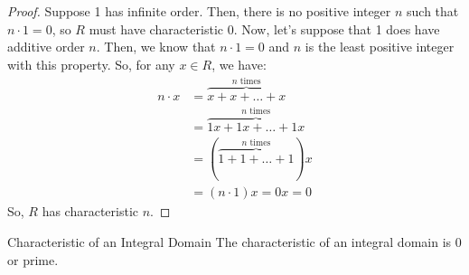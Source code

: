 \documentclass[letterpaper]{article}
\begin{document}
\begin{mdframed}[]
    \begin{proof}
        Suppose 1 has infinite order. Then, there is no positive integer $n$ such that $n \cdot 1 = 0$, so $R$ must have characteristic 0. Now, let's suppose that 1 does have additive order $n$. Then, we know that $n \cdot 1 = 0$ and $n$ is the least positive integer with this property. So, for any $x \in R$, we have: 
        \begin{equation*}
            \begin{aligned}
                n \cdot x &= \overbrace{x + x + \dots + x}^{n \text{ times}} \\ 
                    &= \overbrace{1x + 1x + \dots + 1x}^{n \text{ times}} \\ 
                    &= (\overbrace{1 + 1 + \dots + 1}^{n \text{ times}})x \\ 
                    &= (n \cdot 1)x = 0x = 0
            \end{aligned}
        \end{equation*}
        So, $R$ has characteristic $n$.
    \end{proof}
\end{mdframed}

\begin{theorem}{Characteristic of an Integral Domain}{}
    The characteristic of an integral domain is 0 or prime.
\end{theorem}
\end{document}
